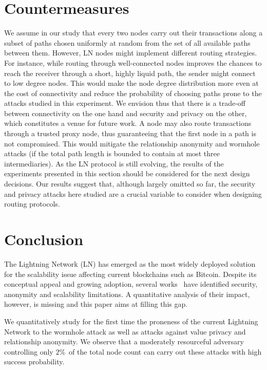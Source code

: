 \section{Countermeasures}
We assume in our study that every two nodes carry out their transactions along a subset of paths chosen uniformly at random from the set of all available paths between them.
However, LN nodes might implement different routing strategies.
For instance, while routing through well-connected nodes improves the chances to reach the receiver through a short, highly liquid path, the sender might connect to low degree nodes.
This would make the node degree distribution more even at the cost of connectivity and reduce the probability of choosing paths prone to the attacks studied in this experiment.
We envision thus that there is a trade-off between connectivity on the one hand and security and privacy on the other, which constitutes a venue for future work.
A node may also route transactions through a trusted proxy node, thus guaranteeing that the first node in a path is not compromised.
This would mitigate the relationship anonymity and wormhole attacks (if the total path length is bounded to contain at most three intermediaries).
As the LN protocol is still evolving, the results of the experiments presented in this section should be considered for the next design decisions.
Our results suggest that, although largely omitted so far, the security and privacy attacks here studied are a crucial variable to consider when designing routing protocols.


\section{Conclusion}
\label{sec:conclusions}

The Lightning Network (LN) has emerged as the most widely deployed solution for the scalability issue affecting current blockchains such as Bitcoin.
Despite its conceptual appeal and growing adoption, several works~\cite{Malavolta2017, Malavolta2019} have identified security, anonymity and scalability limitations.
A quantitative analysis of their impact, however, is missing and this paper aims at filling this gap.

We quantitatively study for the first time the proneness of the current Lightning Network to the wormhole attack as well as attacks against value privacy and relationship anonymity.
We observe that a moderately resourceful adversary controlling only $2\%$~of the total node count can carry out these attacks with high success probability.
